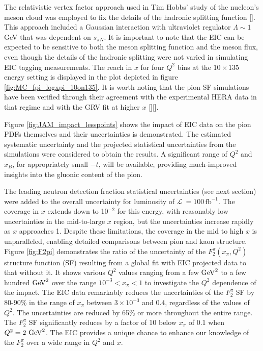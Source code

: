 \documentclass[
]{report}
\begin{document}
The relativistic vertex factor approach used in Tim Hobbs' study of the
nucleon's meson cloud was employed to fix the details of the hadronic
splitting function {[}\cite{hobbs_phenomenological_2015}{]}. This
approach included a Gaussian interaction with ultraviolet regulator
\(\Lambda\! \sim\! 1\,\)GeV that was dependent on \(s_{\pi N}\). It is
important to note that the EIC can be expected to be sensitive to both
the meson splitting function and the meson flux, even though the details
of the hadronic splitting were not varied in simulating EIC tagging
measurements. The reach in \(x\) for four \(Q^2\) bins at the
\(10\times135\) energy setting is displayed in the plot depicted in
figure \ref{fig:MC_fpi_logxpi_10on135}. It is worth noting that the pion
SF simulations have been verified through their agreement with the
experimental HERA data in that regime and with the GRV fit at higher
\(x\) {[}\cite{chekanov_leading_2002}{]}{[}\cite{gluck_pionic_1992}{]}.



Figure \ref{fig:JAM_impact_lesspoints} shows the impact of EIC data on
the pion PDFs themselves and their uncertainties is demonstrated. The
estimated systematic uncertainty and the projected statistical
uncertainties from the simulations were considered to obtain the
results. A significant range of \(Q^2\) and \(x_B\), for appropriately
small \(-t\), will be available, providing much-improved insights into
the gluonic content of the pion.



The leading neutron detection fraction statistical uncertainties (see
next section) were added to the overall uncertainty for luminosity of
\(\mathcal{L}~=100\,\mathrm{fb}^{-1}\). The coverage in \(x\) extends
down to 10\(^{-2}\) for this energy, with reasonably low uncertainties
in the mid-to-large \(x\) region, but the uncertainties increase rapidly
as \(x\) approaches 1. Despite these limitations, the coverage in the
mid to high \(x\) is unparalleled, enabling detailed comparisons between
pion and kaon structure. Figure \ref{fig:F2pi} demonstrates the ratio of
the uncertainty of the \(F_2^\pi(x_\pi,Q^2)\) structure function (SF)
resulting from a global fit with EIC projected data to that without it.
It shows various \(Q^2\) values ranging from a few \({\rm GeV}^2\) to a
few hundred \({\rm GeV}^2\) over the range \(10^{-3}<x_\pi<1\) to
investigate the \(Q^2\) dependence of the impact. The EIC data
remarkably reduces the uncertainties of the \(F_2^\pi\) SF by 80-90\% in
the range of \(x_\pi\) between \(3\times 10^{-3}\) and \(0.4\),
regardless of the values of \(Q^2\). The uncertainties are reduced by
65\% or more throughout the entire range. The \(F_2^\pi\) SF
significantly reduces by a factor of 10 below \(x_\pi\) of 0.1 when
\(Q^2=2~{\rm GeV}^2\). The EIC provides a unique chance to enhance our
knowledge of the \(F_2^\pi\) over a wide range in \(Q^2\) and \(x\).
\end{document}
